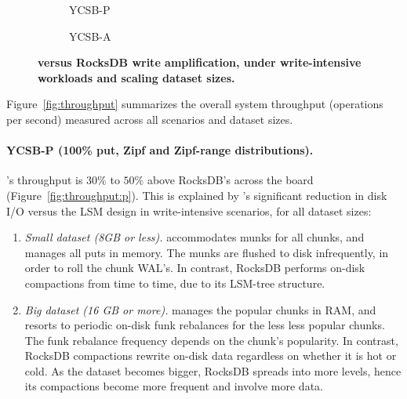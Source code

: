 \begin{figure*}
\centering
\hspace{0.05\linewidth}
\begin{subfigure}{0.3\linewidth}
\caption{YCSB-P}
\label{fig:writeamp:p}
\end{subfigure}
\hspace{0.05\linewidth}
\begin{subfigure}{0.25\linewidth}
\caption{YCSB-A}
\label{fig:writeamp:a}
\end{subfigure}
\caption{\bf{\sys\/ versus RocksDB write amplification, under write-intensive workloads and scaling dataset sizes.}}
\label{fig:writeamp}
\end{figure*}

Figure~\ref{fig:throughput} summarizes the overall system throughput (operations per second) 
measured across all scenarios and dataset sizes. 

\paragraph{YCSB-P (100\% put, Zipf and Zipf-range distributions).} 
\sys's throughput is $30\%$ to $50\%$ above RocksDB's across the board 
(Figure~\ref{fig:throughput:p}). This is explained by \sys's significant reduction 
in disk I/O versus the LSM design in write-intensive scenarios, for all dataset sizes: 

\begin{enumerate}
\item {\em Small dataset (8GB or less).} \sys\/ accommodates munks for all chunks,
and manages all puts in memory. The munks are flushed to disk infrequently, in order 
to roll the chunk WAL's. In contrast, RocksDB performs on-disk compactions from time 
to time, due to its LSM-tree structure.   

\item{\em Big dataset (16 GB or more).} \sys\/ manages the popular chunks in RAM, 
and resorts to periodic on-disk funk rebalances for the less less popular chunks. The 
funk rebalance frequency depends on the chunk's popularity. In contrast, RocksDB 
compactions rewrite on-disk data regardless on whether it is hot or cold. As the dataset
becomes bigger, RocksDB spreads into more levels, hence its compactions become 
more frequent and involve more data.  
\end{enumerate}


